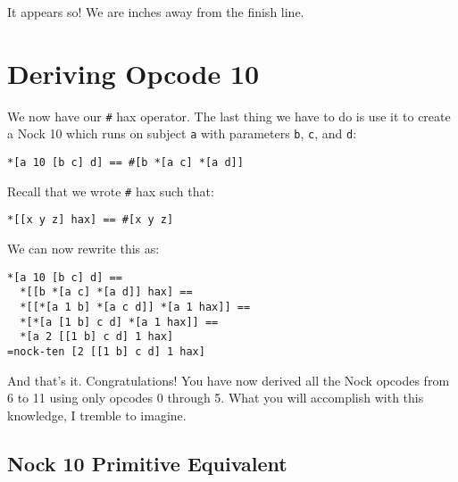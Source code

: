 \documentclass[twoside]{article}
\begin{document}
It appears so! We are inches away from the finish line.

\section{Deriving Opcode 10}

We now have our \lstinline[style=inlinecode]{#} hax operator. The last thing we have to do is use it to create a Nock 10 which runs on subject \lstinline[style=inlinecode]{a} with parameters \lstinline[style=inlinecode]{b}, \lstinline[style=inlinecode]{c}, and \lstinline[style=inlinecode]{d}:

\begin{lstlisting}[style=listingcode]
*[a 10 [b c] d] == #[b *[a c] *[a d]]
\end{lstlisting}

\noindent
Recall that we wrote \lstinline[style=inlinecode]{#} hax such that:

\begin{lstlisting}[style=listingblock]
*[[x y z] hax] == #[x y z]
\end{lstlisting}

\noindent
We can now rewrite this as:

\begin{lstlisting}[style=listingblock]
*[a 10 [b c] d] ==
  *[[b *[a c] *[a d]] hax] ==
  *[[*[a 1 b] *[a c d]] *[a 1 hax]] ==
  *[*[a [1 b] c d] *[a 1 hax]] ==
  *[a 2 [[1 b] c d] 1 hax]
=nock-ten [2 [[1 b] c d] 1 hax]
\end{lstlisting}

\noindent
And that's it. Congratulations! You have now derived all the Nock opcodes from 6 to 11 using only opcodes 0 through 5. What you will accomplish with this knowledge, I tremble to imagine. \tombstone

\newpage
\subsection*{Nock 10 Primitive Equivalent}
\end{document}
